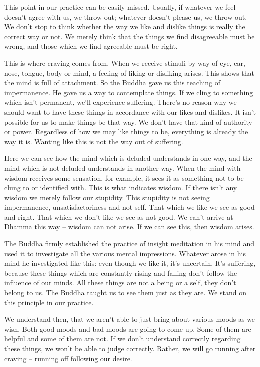This point in our practice can be easily missed. Usually, if whatever we feel doesn't agree with us, we throw out; whatever doesn't please us, we throw out. We don't stop to think whether the way we like and dislike things is really the correct way or not. We merely think that the things we find disagreeable must be wrong, and those which we find agreeable must be right.

This is where craving comes from. When we receive stimuli by way of eye, ear, nose, tongue, body or mind, a feeling of liking or disliking arises. This shows that the mind is full of attachment. So the Buddha gave us this teaching of impermanence. He gave us a way to contemplate things. If we cling to something which isn't permanent, we'll experience suffering. There's no reason why we should want to have these things in accordance with our likes and dislikes. It isn't possible for us to make things be that way. We don't have that kind of authority or power. Regardless of how we may like things to be, everything is already the way it is. Wanting like this is not the way out of suffering.

Here we can see how the mind which is deluded understands in one way, and the mind which is not deluded understands in another way. When the mind with wisdom receives some sensation, for example, it sees it as something not to be clung to or identified with. This is what indicates wisdom. If there isn't any wisdom we merely follow our stupidity. This stupidity is not seeing impermanence, unsatisfactoriness and not-self. That which we like we see as good and right. That which we don't like we see as not good. We can't arrive at Dhamma this way -- wisdom can not arise. If we can see this, then wisdom arises.

The Buddha firmly established the practice of insight meditation in his mind and used it to investigate all the various mental impressions. Whatever arose in his mind he investigated like this: even though we like it, it's uncertain. It's suffering, because these things which are constantly rising and falling don't follow the influence of our minds. All these things are not a being or a self, they don't belong to us. The Buddha taught us to see them just as they are. We stand on this principle in our practice.

We understand then, that we aren't able to just bring about various moods as we wish. Both good moods and bad moods are going to come up. Some of them are helpful and some of them are not. If we don't understand correctly regarding these things, we won't be able to judge correctly. Rather, we will go running after craving -- running off following our desire.

